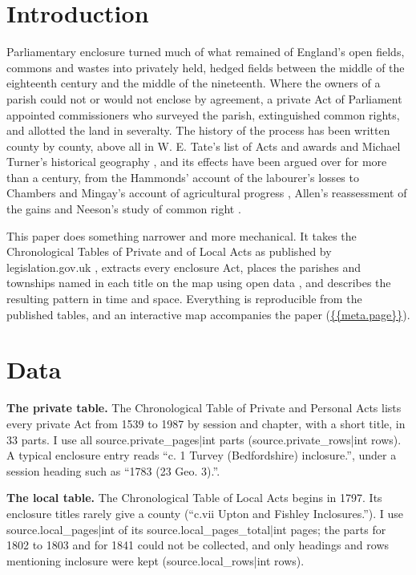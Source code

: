 \documentclass[11pt,a4paper]{article}
\begin{document}
\section{Introduction}
Parliamentary enclosure turned much of what remained of England's open fields, commons and wastes into privately held, hedged fields between the middle of the eighteenth century and the middle of the nineteenth. Where the owners of a parish could not or would not enclose by agreement, a private Act of Parliament appointed commissioners who surveyed the parish, extinguished common rights, and allotted the land in severalty. The history of the process has been written county by county, above all in W. E. Tate's list of Acts and awards \citep{tate1978} and Michael Turner's historical geography \citep{turner1980}, and its effects have been argued over for more than a century, from the Hammonds' account of the labourer's losses \citep{hammond1911} to Chambers and Mingay's account of agricultural progress \citep{chambers1966}, Allen's reassessment of the gains \citep{allen1992} and Neeson's study of common right \citep{neeson1993}.

This paper does something narrower and more mechanical. It takes the Chronological Tables of Private and of Local Acts as published by legislation.gov.uk \citep{legpriv,legloc}, extracts every enclosure Act, places the parishes and townships named in each title on the map using open data \citep{wikidata}, and describes the resulting pattern in time and space. Everything is reproducible from the published tables, and an interactive map accompanies the paper (\url{{{meta.page}}}).

\section{Data}
\textbf{The private table.} The Chronological Table of Private and Personal Acts lists every private Act from 1539 to 1987 by session and chapter, with a short title, in 33 parts. I use all {{source.private_pages|int}} parts ({{source.private_rows|int}} rows). A typical enclosure entry reads ``c. 1 Turvey (Bedfordshire) inclosure.'', under a session heading such as ``1783 (23 Geo. 3).''.

\textbf{The local table.} The Chronological Table of Local Acts begins in 1797. Its enclosure titles rarely give a county (``c.vii Upton and Fishley Inclosures.''). I use {{source.local_pages|int}} of its {{source.local_pages_total|int}} pages; the parts for 1802 to 1803 and for 1841 could not be collected, and only headings and rows mentioning inclosure were kept ({{source.local_rows|int}} rows).
\end{document}

